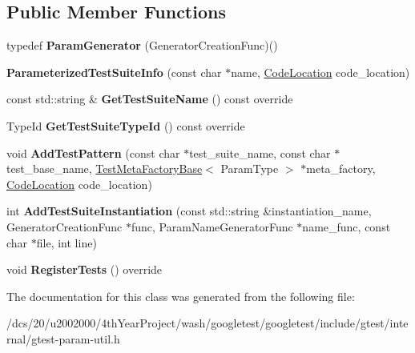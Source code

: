 \subsection*{Public Member Functions}
\begin{DoxyCompactItemize}
\item 
\mbox{\label{classtesting_1_1internal_1_1ParameterizedTestSuiteInfo_ac6230057c507d74e373233edbf0410c2}} 
typedef {\bfseries Param\+Generator} (Generator\+Creation\+Func)()
\item 
\mbox{\label{classtesting_1_1internal_1_1ParameterizedTestSuiteInfo_a56fc02ddec2cf2101332d1125e4c75a9}} 
{\bfseries Parameterized\+Test\+Suite\+Info} (const char $\ast$name, \mbox{\hyperlink{structtesting_1_1internal_1_1CodeLocation}{Code\+Location}} code\+\_\+location)
\item 
\mbox{\label{classtesting_1_1internal_1_1ParameterizedTestSuiteInfo_a4a5ddc2cd0404438c2b4d405cd0e706c}} 
const std\+::string \& {\bfseries Get\+Test\+Suite\+Name} () const override
\item 
\mbox{\label{classtesting_1_1internal_1_1ParameterizedTestSuiteInfo_af488d1d7c1889a250acff2ea6eba4c84}} 
Type\+Id {\bfseries Get\+Test\+Suite\+Type\+Id} () const override
\item 
\mbox{\label{classtesting_1_1internal_1_1ParameterizedTestSuiteInfo_a9d57a40601784b785e9a057b42f3336d}} 
void {\bfseries Add\+Test\+Pattern} (const char $\ast$test\+\_\+suite\+\_\+name, const char $\ast$test\+\_\+base\+\_\+name, \mbox{\hyperlink{classtesting_1_1internal_1_1TestMetaFactoryBase}{Test\+Meta\+Factory\+Base}}$<$ Param\+Type $>$ $\ast$meta\+\_\+factory, \mbox{\hyperlink{structtesting_1_1internal_1_1CodeLocation}{Code\+Location}} code\+\_\+location)
\item 
\mbox{\label{classtesting_1_1internal_1_1ParameterizedTestSuiteInfo_a174f164f38e522a3935da911a9c1e450}} 
int {\bfseries Add\+Test\+Suite\+Instantiation} (const std\+::string \&instantiation\+\_\+name, Generator\+Creation\+Func $\ast$func, Param\+Name\+Generator\+Func $\ast$name\+\_\+func, const char $\ast$file, int line)
\item 
\mbox{\label{classtesting_1_1internal_1_1ParameterizedTestSuiteInfo_a8c0af866d3c291a63d3f4581ccd452d1}} 
void {\bfseries Register\+Tests} () override
\end{DoxyCompactItemize}


The documentation for this class was generated from the following file\+:\begin{DoxyCompactItemize}
\item 
/dcs/20/u2002000/4th\+Year\+Project/wash/googletest/googletest/include/gtest/internal/gtest-\/param-\/util.\+h\end{DoxyCompactItemize}
